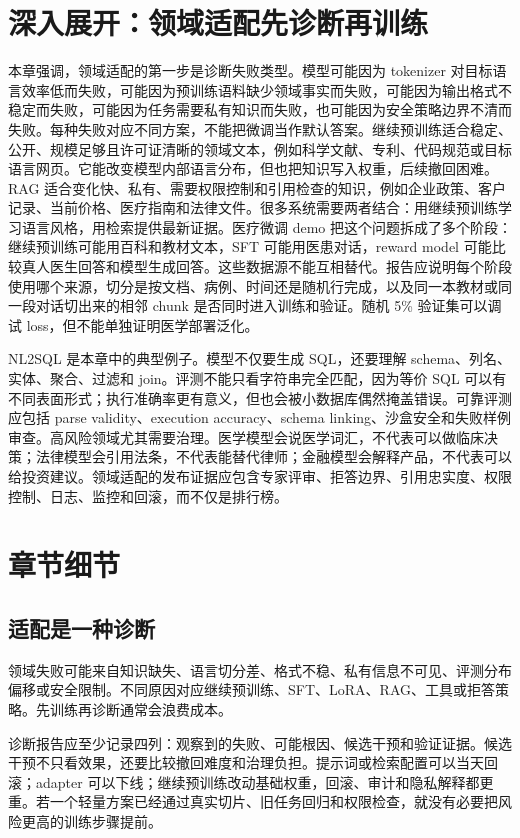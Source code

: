 \documentclass[UTF8,zihao=-4,openany]{ctexbook}
\begin{document}
\section{深入展开：领域适配先诊断再训练}
本章强调，领域适配的第一步是诊断失败类型。模型可能因为 tokenizer 对目标语言效率低而失败，可能因为预训练语料缺少领域事实而失败，可能因为输出格式不稳定而失败，可能因为任务需要私有知识而失败，也可能因为安全策略边界不清而失败。每种失败对应不同方案，不能把微调当作默认答案。继续预训练适合稳定、公开、规模足够且许可证清晰的领域文本，例如科学文献、专利、代码规范或目标语言网页。它能改变模型内部语言分布，但也把知识写入权重，后续撤回困难。RAG 适合变化快、私有、需要权限控制和引用检查的知识，例如企业政策、客户记录、当前价格、医疗指南和法律文件。很多系统需要两者结合：用继续预训练学习语言风格，用检索提供最新证据。医疗微调 demo 把这个问题拆成了多个阶段：继续预训练可能用百科和教材文本，SFT 可能用医患对话，reward model 可能比较真人医生回答和模型生成回答。这些数据源不能互相替代。报告应说明每个阶段使用哪个来源，切分是按文档、病例、时间还是随机行完成，以及同一本教材或同一段对话切出来的相邻 chunk 是否同时进入训练和验证。随机 5\% 验证集可以调试 loss，但不能单独证明医学部署泛化。

NL2SQL 是本章中的典型例子。模型不仅要生成 SQL，还要理解 schema、列名、实体、聚合、过滤和 join。评测不能只看字符串完全匹配，因为等价 SQL 可以有不同表面形式；执行准确率更有意义，但也会被小数据库偶然掩盖错误。可靠评测应包括 parse validity、execution accuracy、schema linking、沙盒安全和失败样例审查。高风险领域尤其需要治理。医学模型会说医学词汇，不代表可以做临床决策；法律模型会引用法条，不代表能替代律师；金融模型会解释产品，不代表可以给投资建议。领域适配的发布证据应包含专家评审、拒答边界、引用忠实度、权限控制、日志、监控和回滚，而不仅是排行榜。

\section{章节细节}
\subsection{适配是一种诊断}
领域失败可能来自知识缺失、语言切分差、格式不稳、私有信息不可见、评测分布偏移或安全限制。不同原因对应继续预训练、SFT、LoRA、RAG、工具或拒答策略。先训练再诊断通常会浪费成本。

诊断报告应至少记录四列：观察到的失败、可能根因、候选干预和验证证据。候选干预不只看效果，还要比较撤回难度和治理负担。提示词或检索配置可以当天回滚；adapter 可以下线；继续预训练改动基础权重，回滚、审计和隐私解释都更重。若一个轻量方案已经通过真实切片、旧任务回归和权限检查，就没有必要把风险更高的训练步骤提前。
\end{document}
